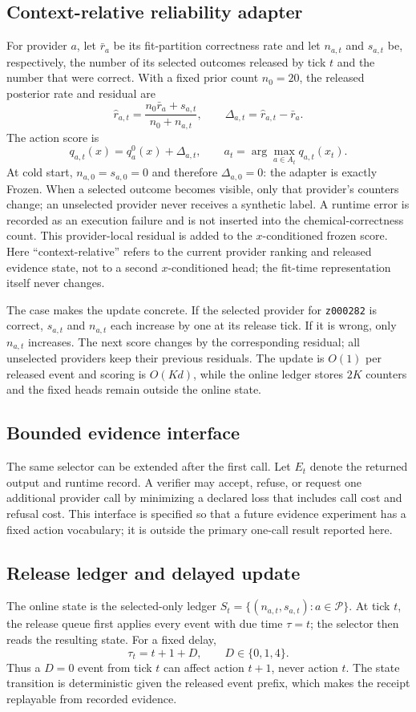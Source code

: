 \documentclass[sigconf,anonymous]{aamas}
\begin{document}
\subsection{Context-relative reliability adapter}
For provider $a$, let $\bar r_a$ be its fit-partition correctness rate and let $n_{a,t}$ and $s_{a,t}$ be, respectively, the number of its selected outcomes released by tick $t$ and the number that were correct. With a fixed prior count $n_0=20$, the released posterior rate and residual are
$$
\widehat r_{a,t}=\frac{n_0\bar r_a+s_{a,t}}{n_0+n_{a,t}},\qquad
\Delta_{a,t}=\widehat r_{a,t}-\bar r_a.
$$
The action score is
$$
q_{a,t}(x)=q_a^0(x)+\Delta_{a,t},
\qquad
 a_t=\arg\max_{a\in A_t}q_{a,t}(x_t).
$$
At cold start, $n_{a,0}=s_{a,0}=0$ and therefore $\Delta_{a,0}=0$: the adapter is exactly Frozen. When a selected outcome becomes visible, only that provider's counters change; an unselected provider never receives a synthetic label. A runtime error is recorded as an execution failure and is not inserted into the chemical-correctness count. This provider-local residual is added to the $x$-conditioned frozen score. Here ``context-relative'' refers to the current provider ranking and released evidence state, not to a second $x$-conditioned head; the fit-time representation itself never changes.

The case makes the update concrete. If the selected provider for \texttt{z000282} is correct, $s_{a,t}$ and $n_{a,t}$ each increase by one at its release tick. If it is wrong, only $n_{a,t}$ increases. The next score changes by the corresponding residual; all unselected providers keep their previous residuals. The update is $O(1)$ per released event and scoring is $O(Kd)$, while the online ledger stores $2K$ counters and the fixed heads remain outside the online state.

\subsection{Bounded evidence interface}
The same selector can be extended after the first call. Let $E_t$ denote the returned output and runtime record. A verifier may accept, refuse, or request one additional provider call by minimizing a declared loss that includes call cost and refusal cost. This interface is specified so that a future evidence experiment has a fixed action vocabulary; it is outside the primary one-call result reported here.

\subsection{Release ledger and delayed update}
The online state is the selected-only ledger $S_t=\{(n_{a,t},s_{a,t}) : a\in\mathcal P\}$. At tick $t$, the release queue first applies every event with due time $\tau=t$; the selector then reads the resulting state. For a fixed delay,
$$
\tau_t=t+1+D,\qquad D\in\{0,1,4\}.
$$
Thus a $D=0$ event from tick $t$ can affect action $t+1$, never action $t$. The state transition is deterministic given the released event prefix, which makes the receipt replayable from recorded evidence.
\end{document}
